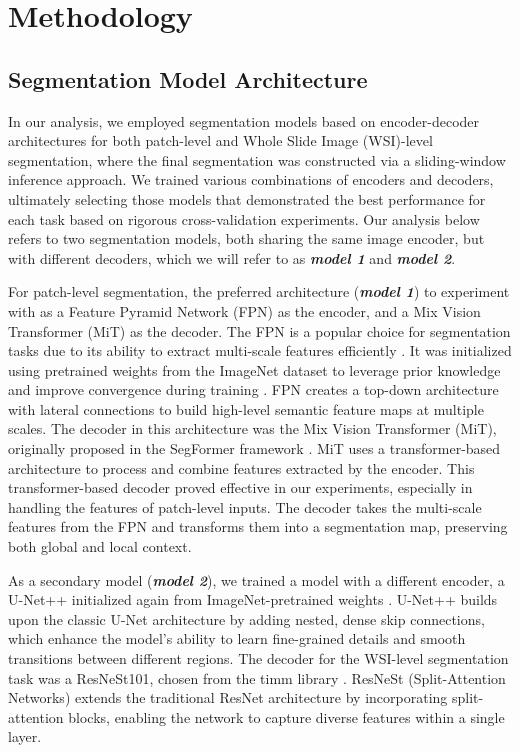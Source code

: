 \section{Methodology}


\subsection{Segmentation Model Architecture}
In our analysis, we employed segmentation models based on encoder-decoder architectures for both patch-level and Whole Slide Image (WSI)-level segmentation, where the final segmentation was constructed via a sliding-window inference approach. 
We trained various combinations of encoders and decoders, ultimately selecting those models that demonstrated the best performance for each task based on rigorous cross-validation experiments.
Our analysis below refers to two segmentation models, both sharing the same image encoder, but with different decoders, which we will refer to as \textbf{\textit{model 1}} and \textbf{\textit{model 2}}.

For patch-level segmentation, the preferred architecture (\textbf{\textit{model 1}}) to experiment with as a Feature Pyramid Network (FPN) as the encoder, and a Mix Vision Transformer (MiT) as the decoder. 
The FPN is a popular choice for segmentation tasks due to its ability to extract multi-scale features efficiently \cite{lin2017feature}. 
It was initialized using pretrained weights from the ImageNet dataset to leverage prior knowledge and improve convergence during training \cite{qubvel2023segmentation}. 
FPN creates a top-down architecture with lateral connections to build high-level semantic feature maps at multiple scales. 
The decoder in this architecture was the Mix Vision Transformer (MiT), originally proposed in the SegFormer framework \cite{xie2021segformer}. 
MiT uses a transformer-based architecture to process and combine features extracted by the encoder. 
This transformer-based decoder proved effective in our experiments, especially in handling the features of patch-level inputs. 
The decoder takes the multi-scale features from the FPN and transforms them into a segmentation map, preserving both global and local context.

As a secondary model (\textbf{\textit{model 2}}), we trained a model with a different encoder, a U-Net++ initialized again from ImageNet-pretrained weights \cite{qubvel2023segmentation}. 
U-Net++ builds upon the classic U-Net architecture by adding nested, dense skip connections, which enhance the model's ability to learn fine-grained details and smooth transitions between different regions. The decoder for the WSI-level segmentation task was a ResNeSt101, chosen from the timm library \cite{qubvel2023segmentation}. 
ResNeSt (Split-Attention Networks) extends the traditional ResNet architecture by incorporating split-attention blocks, enabling the network to capture diverse features within a single layer.


